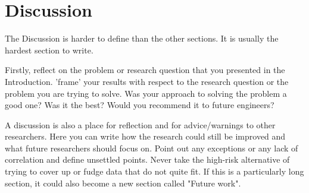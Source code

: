 \chapter{Discussion}
 
The Discussion is harder to define than the other sections. It is usually the hardest section to write. 

Firstly, reflect on the problem or research question that you presented in the Introduction. 'frame' your results with respect to the research question or the problem you are trying to solve. Was your approach to solving the problem a good one? Was it the best? Would you recommend it to future engineers?

A discussion is also a place for reflection and for advice/warnings to other researchers. Here you can write how the research could still be improved and what future researchers should focus on. Point out any exceptions or any lack of correlation and define unsettled points. Never take the high-risk alternative of trying to cover up or fudge data that do not quite fit. If this is a particularly long section, it could also become a new section called "Future work".
